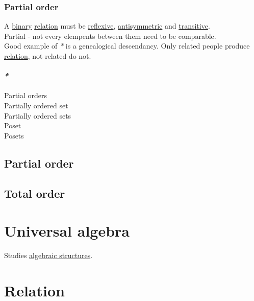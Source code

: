 \documentclass[a4paper,14pt,oneside]{book}
\begin{document}
\subsection{\label{org7b34a26}Partial order}
\label{sec:org98149e1}

A \hyperref[orgd4bd390]{binary} \hyperref[org3bec6ce]{relation} must be \hyperref[org7d60c20]{reflexive}, \hyperref[orgc699b09]{antisymmetric} and \hyperref[org0ec6bad]{transitive}.\\

Partial - not every elempents between them need to be comparable.\\

Good example of \emph{*} is a genealogical descendancy. Only related people produce \hyperref[org3bec6ce]{relation}, not related do not.\\

\subsubsection{\emph{*}}
\label{sec:org44a28e5}

\label{org3d3eb93}Partial orders\\
\label{org9d3ec4c}Partially ordered set\\
\label{orgaed4a9d}Partially ordered sets\\
\label{org44185ad}Poset\\
\label{org6e2d0ba}Posets\\

\section{\label{orgafada34}Partial order}
\label{sec:orgb8be0b9}

\section{\label{org86127fc}Total order}
\label{sec:org488dfe2}

\chapter{\label{org3e1a5c8}Universal algebra}
\label{sec:orgaf1c7dc}

Studies \hyperref[orgcc4705a]{algebraic structures}.\\

\chapter{\label{org398f0e9}Relation}
\label{sec:org1766f09}
\end{document}
